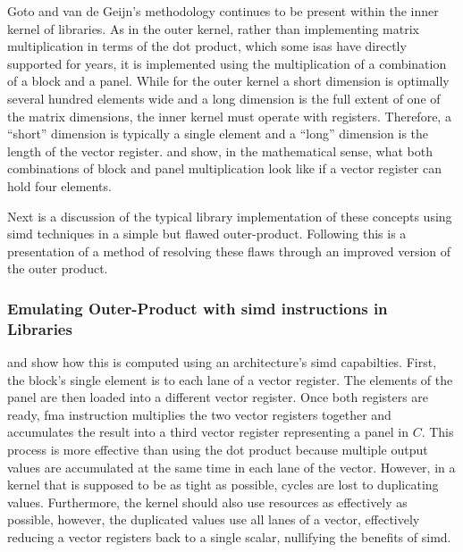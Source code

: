 \documentclass[\main/thesis.tex]{subfiles}
\begin{document}

Goto and van de Geijn's methodology continues to be present within the inner kernel of libraries.
As in the outer kernel, rather than implementing matrix multiplication in terms of the dot product, which some \glspl{isa} have directly supported for years\footnotemark, it is implemented using the multiplication of a combination of a block and a panel.
While for the outer kernel a short dimension is optimally several hundred elements wide and a long dimension is the full extent of one of the matrix dimensions, the inner kernel must operate with registers.
Therefore, a ``short'' dimension is typically a single element and a ``long'' dimension is the length of the vector register.
 and  show, in the mathematical sense, what both combinations of block and panel multiplication look like if a vector register can hold four elements.

Next is a discussion of the typical library implementation of these concepts using \gls{simd} techniques in a simple but flawed outer-product.
Following this is a presentation of a method of resolving these flaws through an improved version of the outer product.

\subsubsection{Emulating Outer-Product with \gls{simd} instructions in Libraries}
 and  show how this is computed using an architecture's \gls{simd} capabilties.
First, the block's single element is  to each \gls{lane} of a vector register.
The elements of the panel are then loaded into a different vector register.
Once both registers are ready,  \gls{fma} instruction multiplies the two vector registers together and accumulates the result into a third vector register representing a panel in $C$.
This process is more effective than using the dot product because multiple output values are accumulated at the same time in each \gls{lane} of the vector.
However, in a kernel that is supposed to be as tight as possible, cycles are lost to duplicating values.
Furthermore, the kernel should also use resources as effectively as possible, however, the duplicated values use all \glspl{lane} of a vector, effectively reducing a vector registers back to a single scalar, nullifying the benefits of \gls{simd}.
\end{document}
